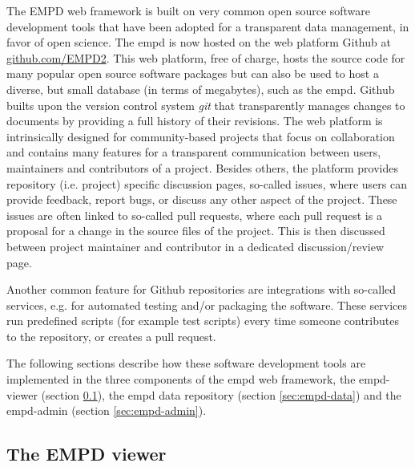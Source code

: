 \documentclass[
11pt, %
english, %
singlespacing, %
headsepline, %
]{MastersDoctoralThesis} %
\begin{document}
\begin{NoHyper}
\begin{refsection}
The EMPD web framework is built on very common open source software development tools that have been adopted for a transparent data management, in favor of open science. The \gls{empd} is now hosted on the web platform Github at \href{https://github.com/EMPD2}{github.com/EMPD2}. This web platform, free of charge, hosts the source code for many popular open source software packages but can also be used to host a diverse, but small database (in terms of megabytes), such as the \gls{empd}. Github builts upon the version control system \textit{git} that transparently manages changes to documents by providing a full history of their revisions. The web platform is intrinsically designed for community-based projects that focus on collaboration and contains many features for a transparent communication between users, maintainers and contributors of a project. Besides others, the platform provides repository (i.e. project) specific discussion pages, so-called issues, where users can provide feedback, report bugs, or discuss any other aspect of the project. These issues are often linked to so-called pull requests, where each pull request is a proposal for a change in the source files of the project. This is then discussed between project maintainer and contributor in a dedicated discussion/review page.

Another common feature for Github repositories are integrations with so-called  services, e.g. for automated testing and/or packaging the software. These services run predefined scripts (for example test scripts) every time someone contributes to the repository, or creates a pull request.

The following sections describe how these software development tools are implemented in the three components of the \gls{empd} web framework, the \gls{empd}-viewer (section \ref{sec:empd-viewer}), the \gls{empd} data repository (section \ref{sec:empd-data}) and the \gls{empd}-admin (section \ref{sec:empd-admin}).

\subsection{The EMPD viewer}\label{sec:empd-viewer}


\end{refsection}
\end{NoHyper}
\end{document}
